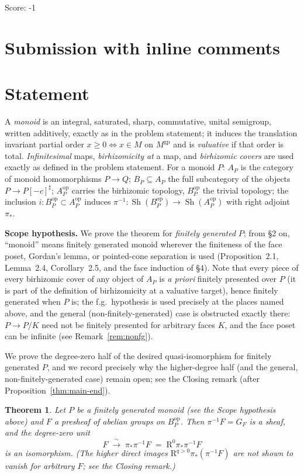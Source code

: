 \documentclass[11pt]{article}
\newtheorem{theorem}{Theorem}[section]
\theoremstyle{definition}
\newcommand{\gp}{\mathrm{gp}}
\newcommand{\op}{\mathrm{op}}
\newcommand{\Sh}{\operatorname{Sh}}
\begin{document}
\noindent Score: -1

\newpage
\section{Submission with inline comments}


\section{Statement}\label{sec:intro}

A \emph{monoid} is an integral, saturated, sharp, commutative, unital
semigroup, written additively, exactly as in the problem statement; it
induces the translation invariant partial order $x\ge0\iff x\in M$ on
$M^{\gp}$ and is \emph{valuative} if that order is total.
\emph{Infinitesimal} maps, \emph{birhizomicity at} a map, and
\emph{birhizomic covers} are used exactly as defined in the problem
statement. For a monoid $P$: $A_P$ is the category of monoid
homomorphisms $P\to Q$; $B_P\subseteq A_P$ the full subcategory of the
objects $P\to P[-c]^{\sharp}$; $A_P^{\op}$ carries the birhizomic
topology, $B_P^{\op}$ the trivial topology; the inclusion
$i:B_P^{\op}\subset A_P^{\op}$ induces
$\pi^{-1}:\Sh(B_P^{\op})\to\Sh(A_P^{\op})$ with right adjoint $\pi_{*}$.

\noindent\textbf{Scope hypothesis.} We prove the theorem for
\emph{finitely generated} $P$; from \S2 on, ``monoid'' means
finitely generated monoid wherever the finiteness of the face poset,
Gordan's lemma, or pointed-cone separation is used (Proposition~2.1,
Lemma~2.4, Corollary~2.5, and the face induction of \S4). Note that
every piece of every birhizomic cover of any object of $A_P$ is
\emph{a priori} finitely presented over $P$ (it is part of the
definition of birhizomicity at a valuative target), hence finitely
generated when $P$ is; the f.g.\ hypothesis is used precisely at the
places named above, and the general (non-finitely-generated) case is
obstructed exactly there: $P\to P/K$ need not be finitely presented
for arbitrary faces $K$, and the face poset can be infinite (see
Remark~\ref{rem:nonfg}).

We prove the degree-zero half of the desired quasi-isomorphism for
finitely generated $P$, and we record precisely why the higher-degree
half (and the general, non-finitely-generated case) remain open; see
the Closing remark (after Proposition~\ref{thm:main-end}).

\begin{theorem}\label{thm:main}
Let $P$ be a \emph{finitely generated} monoid \textup{(}see the Scope
hypothesis above\textup{)} and $F$ a presheaf of abelian groups on
$B_P^{\op}$. Then $\pi^{-1}F=G_F$ is a sheaf, and the degree-zero
unit
\[
F\;\xrightarrow{\ \sim\ }\;\pi_{*}\pi^{-1}F
\;=\;\mathrm R^{0}\pi_{*}\pi^{-1}F
\]
is an isomorphism. \textup{(}The higher direct images
$\mathrm R^{q>0}\pi_{*}(\pi^{-1}F)$ are \emph{not} shown to vanish
for arbitrary $F$; see the Closing remark.\textup{)}
\end{theorem}
\end{document}
